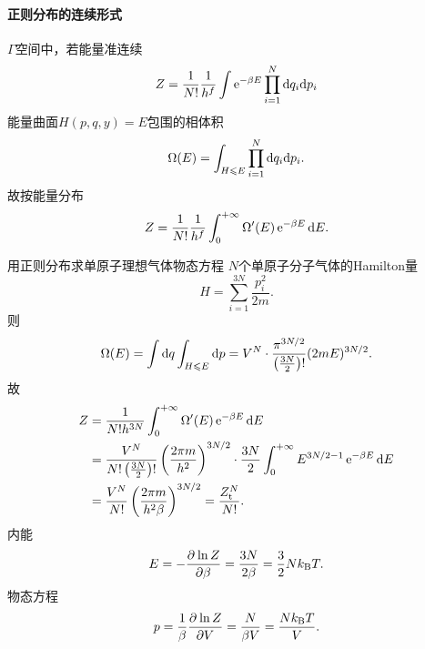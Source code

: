 \paragraph{正则分布的连续形式}$\varGamma$空间中，若能量准连续
\begin{align}
	Z=\frac1{N!}\frac1{h^f}\int\mathop{}\!\mathrm{e}^{-\beta E}\prod_{i=1}^N\mathop{}\!\mathrm{d} q_i\mathrm{d} p_i
\end{align}
能量曲面$H(p,q,y)=E$包围的相体积
\begin{align}
	\Omega(E)=\int_{H\leqslant E}\prod_{i=1}^N\mathop{}\!\mathrm{d} q_i\mathrm{d} p_i.
\end{align}
故按能量分布
\begin{align}
	Z=\frac1{N!}\frac1{h^f}\int_0^{+\infty}\Omega'(E)\mathop{}\!\mathrm{e}^{-\beta E}\mathop{}\!\mathrm{d} E.
\end{align}
\begin{example}{用正则分布求单原子理想气体物态方程}{}
	$N$个单原子分子气体的Hamilton量
	\[
		H=\sum_{i=1}^{3N}\frac{p_i^2}{2m}.
	\]
	则
	\[
		\Omega(E)=\int\mathop{}\!\mathrm{d} q\int_{H\leqslant E}\mathop{}\!\mathrm{d} p=V^N\cdot\frac{\pi^{3N/2}}{\left(\frac{3N}2\right)!}(2mE)^{3N/2}.
	\]
	故
	\begin{align*}
		Z&=\frac1{N!h^{3N}}\int\zti\Omega'(E)\e{-\beta E}\d E\\
		&=\frac{V^N}{N!\kh{\frac{3N}2}!}\kh{\frac{2\pi m}{h^2}}^{3N/2}\cdot\frac{3N}2\int\zti E^{3N/2-1}\e{-\beta E}\d E\\
		&%
		=\frac{V^N}{N!}\kh{\frac{2\pi m}{h^2\beta}}^{3N/2}=\frac{Z_\tl^N}{N!}.
	\end{align*}
	内能
	\begin{align}
		E=-\frac{\partial^{{}}\ln Z}{\partial{\beta}^{{}}}=\frac{3N}{2\beta}=\frac32Nk_{\mathrm B} T.
	\end{align}
	物态方程
	\begin{align}
		p=\frac1\beta\frac{\partial^{{}}\ln Z}{\partial{V}^{{}}}=\frac N{\beta V}=\frac{Nk_{\mathrm B} T}V.
	\end{align}
\end{example}
